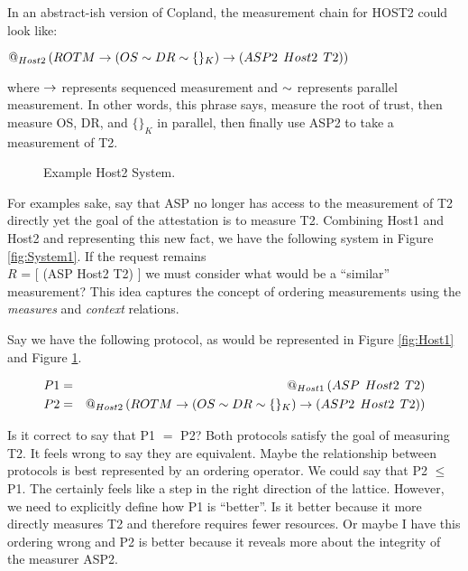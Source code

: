 \documentclass[12pt, letterpaper]{article}
\begin{document}
In an abstract-ish version of Copland, the measurement chain for HOST2 could look like: 

\begin{center}
  $ \mathop{@_{Host2}}{(ROTM \to ( OS \stackrel{}{\sim} DR \stackrel{}{\sim} \{ \}_{K} ) \to (ASP2\:\: Host2\:\: T2))}$
\end{center}

where $\to$ represents sequenced measurement and $\stackrel{}{\sim}$ represents parallel measurement. In other words, this phrase says, measure the root of trust, then measure OS, DR, and $\{ \}_{K}$ in parallel, then finally use ASP2 to take a measurement of T2. 


\begin{figure}[]
  \centering 
  \caption{Example Host2 System.}
  \label{fig:Host2}
\end{figure}

For examples sake, say that ASP no longer has access to the measurement of T2 directly yet the goal of the attestation is to measure T2. Combining Host1 and Host2 and representing this new fact, we have the following system in Figure \ref{fig:System1}. If the request remains \\  $R$ = [ (ASP Host2 T2) ] we must consider what would be a ``similar'' measurement? This idea captures the concept of ordering measurements using the \emph{measures} and \emph{context} relations. 


\pagebreak
Say we have the following protocol, as would be represented in Figure \ref{fig:Host1} and Figure \ref{fig:Host2}.

\begin{eqnarray*}
  P1 &=& \mathop{@_{Host1}}{(}ASP\:\: Host2\:\: T2) \\
  P2 &=& \mathop{@_{Host2}}{(ROTM \to ( OS \stackrel{}{\sim} DR \stackrel{}{\sim} \{ \}_{K} ) \to (ASP2\:\: Host2\:\: T2))}
\end{eqnarray*}

Is it correct to say that P1 $=$ P2? Both protocols satisfy the goal of measuring T2. It feels wrong to say they are equivalent. Maybe the relationship between protocols is best represented by an ordering operator. We could say that P2 $\leq$ P1. The certainly feels like a step in the right direction of the lattice. However, we need to explicitly define how P1 is ``better''. Is it better because it more directly measures T2 and therefore requires fewer resources. Or maybe I have this ordering wrong and P2 is better because it reveals more about the integrity of the measurer ASP2. 
\end{document}
